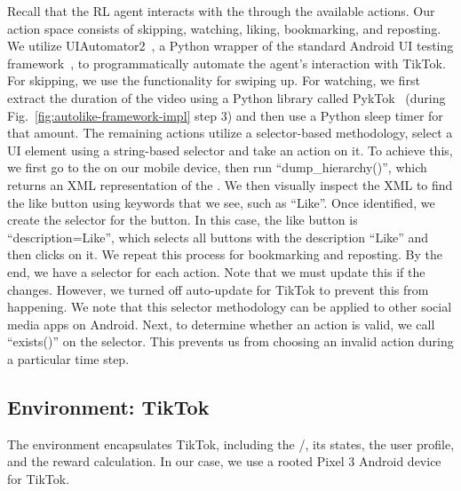 Recall that the RL agent interacts with the \rs{} through the available actions. Our action space consists of skipping, watching, liking, bookmarking, and reposting. 
We utilize UIAutomator2~\cite{uiautomator2}, a Python wrapper of the standard Android UI testing framework~\cite{UIAutomator}, to programmatically automate the agent's interaction with TikTok. %
For skipping, we use the functionality for swiping up. For watching, we first extract the duration of the video using a Python library called PykTok~\cite{pyktok} (during Fig.~\ref{fig:autolike-framework-impl} step 3) and then use a Python sleep timer for that amount. The remaining actions utilize a selector-based methodology, \ie{} select a UI element using a string-based selector and take an action on it. To achieve this, we first go to the \fyp{} on our mobile device, then run ``dump\_hierarchy()'', which returns an XML representation of the \fyp{}. We then visually inspect the XML to find the like button using keywords that we see, such as ``Like''. Once identified, we create the selector for the button. In this case, the like button is ``description=Like'', which selects all buttons with the description ``Like'' and then clicks on it. %
We repeat this process for bookmarking and reposting. By the end, we have a selector for each action. Note that we must update this if the \fyp{} changes. However, we turned off auto-update for TikTok to prevent this from happening. 
We note that this selector methodology can be applied to other social media apps on Android.
Next, to determine whether an action is valid, we call ``exists()'' on the selector. This prevents us from choosing an invalid action during a particular time step.



\subsection{Environment: TikTok}
\label{sec:autolike-env}

The environment encapsulates TikTok, including the \rs{}/\fyp{}, its states, the user profile, and the reward calculation. In our case, we use a rooted Pixel 3 Android device for TikTok. 

